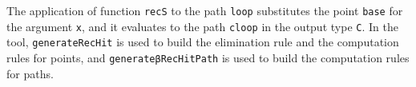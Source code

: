 \documentclass[runningheads]{llncs}
\begin{document}
The application of function {\tt recS} to the path {\tt loop} substitutes the point {\tt base} for the argument {\tt x}, and it evaluates to the path {\tt cloop} in the output type {\tt C}. In the tool, {\tt generateRecHit} is used to build the elimination rule and the computation rules for points, and {\tt generateβRecHitPath} is used to build the computation rules for paths. 

%
\end{document}
